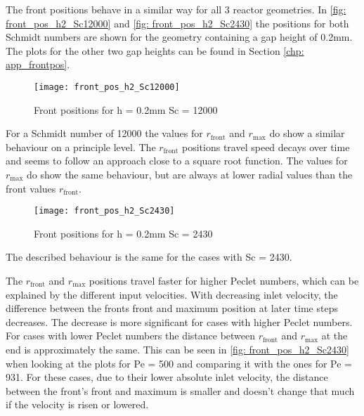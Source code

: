 \documentclass[../thesis.tex]{subfiles}
\begin{document}
The front positions behave in a similar way for all 3 reactor geometries. In \autoref{fig: front_pos_h2_Sc12000} and \autoref{fig: front_pos_h2_Sc2430} the positions for both Schmidt numbers are shown for the geometry containing a gap height of 0.2mm. The plots for the other two gap heights can be found in Section \ref{chp: app_frontpos}.
\begin{figure}[htbp]
	\centering
	\texttt{[image: front\_pos\_h2\_Sc12000]}
	\caption{Front positions for  h = 0.2mm Sc = 12000
	\label{fig: front_pos_h2_Sc12000}}
\end{figure}
For a Schmidt number of 12000 the values for $r_{\text{front}}$ and $r_{\text{max}}$ do show a similar behaviour on a principle level. The $r_{\text{front}}$ positions travel speed decays over time and seems to follow an approach close to a square root function. The values for $r_{\text{max}}$ do show the same behaviour, but are always at lower radial values than the front values $r_{\text{front}}$.
\begin{figure}[htb]
	\centering
	\texttt{[image: front\_pos\_h2\_Sc2430]}
	\caption{Front positions for  h = 0.2mm Sc = 2430
	\label{fig: front_pos_h2_Sc2430}}
\end{figure}

The described behaviour is the same for the cases with Sc = 2430.

The $r_{\text{front}}$ and $r_{\text{max}}$ positions travel faster for higher Peclet numbers, which can be explained by the different input velocities. With decreasing inlet velocity, the difference between the fronts front and maximum position at later time steps decreases. The decrease is more significant for cases with higher Peclet numbers. For cases with lower Peclet numbers the distance between  $r_{\text{front}}$ and $r_{\text{max}}$ at the end is approximately the same. This can be seen in \autoref{fig: front_pos_h2_Sc2430} when looking at the plots for Pe = 500 and comparing it with the ones for Pe = 931. For these cases, due to their lower absolute inlet velocity, the distance between the front's front and maximum is smaller and doesn't change that much if the velocity is risen or lowered.
\end{document}

